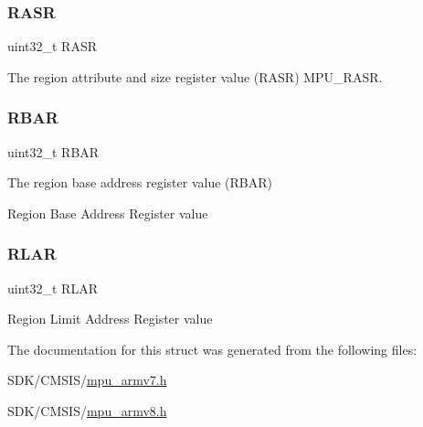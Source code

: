 \subsubsection{\texorpdfstring{R\+A\+SR}{RASR}}
{\footnotesize\ttfamily uint32\+\_\+t R\+A\+SR}



The region attribute and size register value (R\+A\+SR) M\+P\+U\+\_\+\+R\+A\+SR. 

\mbox{\label{struct_a_r_m___m_p_u___region__t_a0b30f076910cb037e031563046dd5e10}} 
\subsubsection{\texorpdfstring{R\+B\+AR}{RBAR}}
{\footnotesize\ttfamily uint32\+\_\+t R\+B\+AR}



The region base address register value (R\+B\+AR) 

Region Base Address Register value \mbox{\label{struct_a_r_m___m_p_u___region__t_ae9f3dcae5bc76cea6379c01975cc335b}} 
\subsubsection{\texorpdfstring{R\+L\+AR}{RLAR}}
{\footnotesize\ttfamily uint32\+\_\+t R\+L\+AR}

Region Limit Address Register value 

The documentation for this struct was generated from the following files\+:\begin{DoxyCompactItemize}
\item 
S\+D\+K/\+C\+M\+S\+I\+S/\mbox{\hyperlink{mpu__armv7_8h}{mpu\+\_\+armv7.\+h}}\item 
S\+D\+K/\+C\+M\+S\+I\+S/\mbox{\hyperlink{mpu__armv8_8h}{mpu\+\_\+armv8.\+h}}\end{DoxyCompactItemize}
